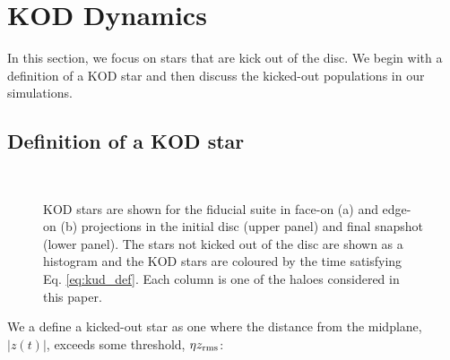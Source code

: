 \section{KOD Dynamics} \label{sec:kud}

In this section, we focus on stars that are kick out of the disc.
We begin with a definition of a KOD star and then discuss the 
kicked-out populations in our simulations.

\subsection{Definition of a KOD star} \label{ssec:def}

\begin{figure}
    \centering
    \\ 
\caption{KOD stars are shown for the fiducial suite in face-on (a) and
  edge-on (b) projections in the initial disc (upper panel) and final
  snapshot (lower panel). The stars not kicked out of the disc are
  shown as a histogram and the KOD stars are coloured by the time
  satisfying Eq. \ref{eq:kud_def}. Each column is one of the haloes
  considered in this paper.}
	\label{fig:kud_stars_final_ics}
\end{figure}
We a define a kicked-out star as one where the distance from the
midplane, $|z(t)|$, exceeds some threshold, $\eta z_{\rm rms}$:
